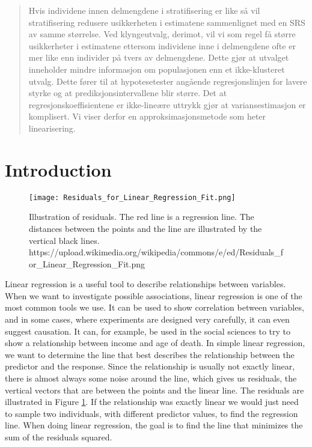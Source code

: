 \documentclass{article}
\begin{document}
\begin{abstract}
  Hvis individene innen delmengdene i stratifisering er like så vil
  stratifisering redusere usikkerheten i estimatene sammenlignet med en SRS av
  samme størrelse. Ved klyngeutvalg, derimot, vil vi som regel få større
  usikkerheter i estimatene ettersom individene inne i delmengdene ofte er mer
  like enn individer på tvers av delmengdene. Dette gjør at utvalget inneholder
  mindre informasjon om populasjonen enn et ikke-klusteret utvalg. Dette fører
  til at hypotesetester angående regresjonslinjen for lavere styrke og at
  prediksjonsintervallene blir større. Det at
  regresjonskoeffisientene er ikke-lineære uttrykk gjør at variansestimasjon er
  komplisert. Vi viser derfor en approksimasjonsmetode som heter linearisering.
\end{abstract}

\newpage

\tableofcontents

\newpage

\section{Introduction} \label{sec:intro}

\begin{figure}
  \centering
  \texttt{[image: Residuals\_for\_Linear\_Regression\_Fit.png]}
  \caption{Illustration of residuals. The red line is a regression line. The
    distances between the points and the line are illustrated by the vertical
    black lines.
    https://upload.wikimedia.org/wikipedia/commons/e/ed/Residuals\_for\_Linear\_Regression\_Fit.png
  }
  \label{fig:residuals}
  
\end{figure}

Linear regression is a useful tool to describe relationships between variables.
When we want to investigate possible associations, linear regression
is one of the most common tools we use. It can be used to show correlation between
variables, and in some cases, where experiments are designed very carefully, it can even suggest causation.
It can, for example, be used in the social sciences to try to show a relationship
between income and age of death. In simple linear regression, we want to determine the
line that best describes the relationship between the predictor and the
response. Since the relationship is usually not exactly linear, there is almost
always some noise around the line, which gives us residuals, the vertical
vectors that are between the points and the linear line. The residuals are illustrated
in Figure \ref{fig:residuals}. If the relationship was
exactly linear we would just need to sample two individuals, with different
predictor values, to find the regression line. When doing linear
regression, the goal is to find the line that minimizes the sum of the residuals
squared. 
\end{document}
